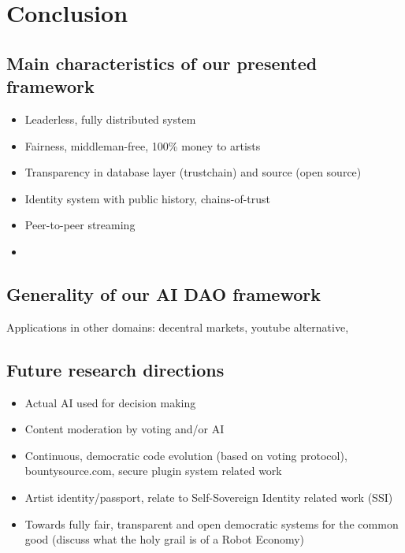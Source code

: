 \chapter{Conclusion}
\section{Main characteristics of our presented framework}
\begin{itemize}
    \item Leaderless, fully distributed system
    \item Fairness, middleman-free, 100\% money to artists
    \item Transparency in database layer (trustchain) and source (open source)
    \item Identity system with public history, chains-of-trust
    \item Peer-to-peer streaming
    \item 
\end{itemize}
\section{Generality of our AI DAO framework}
Applications in other domains: decentral markets, youtube alternative, 
\section{Future research directions}
\begin{itemize}
    \item Actual AI used for decision making
    \item Content moderation by voting and/or AI
    \item Continuous, democratic code evolution (based on voting protocol), bountysource.com, secure plugin system related work
    \item Artist identity/passport, relate to Self-Sovereign Identity related work (SSI)
    \item Towards fully fair, transparent and open democratic systems for the common good (discuss what the holy grail is of a Robot Economy)
\end{itemize}
